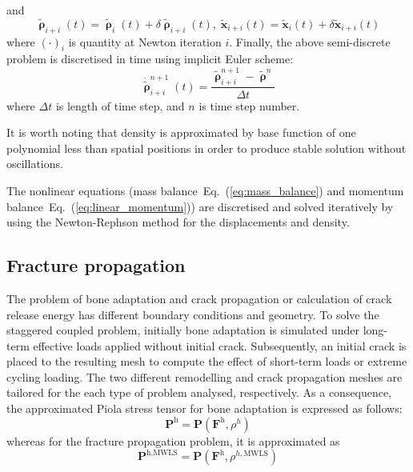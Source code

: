 \documentclass[review]{elsarticle}
\numberwithin{equation}{section}
\begin{document}
and 
\begin{equation}
\tilde{\pmb\uprho}_{i+i}(t) =
\tilde{\pmb\uprho}_{i}(t) + \delta\tilde{\pmb\uprho}_{i+i}(t),\;
	\tilde{\mathbf{x}}_{i+i}(t) =
	\tilde{\mathbf{x}}_{i}(t) + \delta\tilde{\mathbf{x}}_{i+i}(t)
\end{equation}
where $(\cdot)_i$ is quantity at Newton iteration $i$. Finally, the
above semi-discrete problem is discretised in time using implicit Euler scheme:
\begin{equation}
	\dot{\tilde{\pmb\uprho}}_{i+i}^{n+1}(t) =
	\frac{
	\tilde{\pmb\uprho}_{i+i}^{n+1}-\tilde{\pmb\uprho}^{n}
	}{\Delta t}
\end{equation}
where $\Delta t$ is length of time step, and $n$ is time step number.

It is worth noting that density is approximated by base  function of one polynomial less than spatial positions in
order to produce stable solution without oscillations.

The nonlinear equations (mass
balance~Eq.~(\ref{eq:mass_balance}) and momentum
balance~Eq.~(\ref{eq:linear_momentum})) are discretised and solved iteratively by
using the Newton-Rephson method for the displacements and density.

%
%
\subsection{Fracture propagation}

The problem of bone adaptation and crack propagation or calculation of crack
release energy has different boundary conditions and geometry. 
To solve the staggered coupled problem, initially bone adaptation is simulated under 
long-term effective loads applied without initial crack. Subsequently, an 
initial crack is placed to the resulting mesh to compute the effect 
of short-term loads or extreme cycling loading. The two different remodelling and crack propagation 
meshes are tailored for the each type of problem analysed, respectively. As
a consequence, the approximated Piola stress tensor for bone
adaptation is expressed as follows:
\begin{equation}
	\mathbf{P}^\textrm{h} = 
		\mathbf{P}(\mathbf{F}^\textrm{h}, \rho^h)
\end{equation}
whereas for the fracture propagation problem, it is approximated as
\begin{equation}
	\mathbf{P}^{\textrm{h},\textrm{MWLS}} = 
		\mathbf{P}(
		\mathbf{F}^\textrm{h}, \rho^{h,\textrm{MWLS}})
\end{equation}
\end{document}
